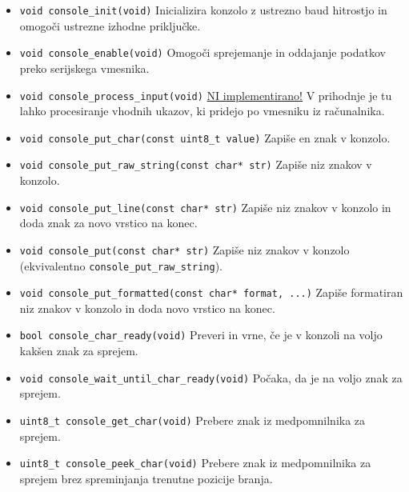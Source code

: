 \documentclass[12pt,a4paper,twoside,openright,slovene]{book}
\begin{document}
\begin{itemize}
	\item[] \lstinline{void console_init(void)}\newline
		Inicializira konzolo z ustrezno baud hitrostjo in omogoči ustrezne izhodne priključke.
	\item[] \lstinline{void console_enable(void)}\newline
		Omogoči sprejemanje in oddajanje podatkov preko serijskega vmesnika.
	\item[] \lstinline{void console_process_input(void)}\newline
		\underline{NI implementirano!} V prihodnje je tu lahko procesiranje vhodnih ukazov, ki pridejo po vmesniku iz računalnika.
	\item[] \lstinline{void console_put_char(const uint8_t value)}\newline
		Zapiše en znak v konzolo.
	\item[] \lstinline{void console_put_raw_string(const char* str)}\newline
		Zapiše niz znakov v konzolo.
	\item[] \lstinline{void console_put_line(const char* str)}\newline
		Zapiše niz znakov v konzolo in doda znak za novo vrstico na konec.
	\item[] \lstinline{void console_put(const char* str)}\newline
		Zapiše niz znakov v konzolo (ekvivalentno \lstinline{console_put_raw_string}).
	\item[] \lstinline{void console_put_formatted(const char* format, ...)}\newline
		Zapiše formatiran niz znakov v konzolo in doda novo vrstico na konec.
	\item[] \lstinline{bool console_char_ready(void)}\newline
		Preveri in vrne, če je v konzoli na voljo kakšen znak za sprejem.
	\item[] \lstinline{void console_wait_until_char_ready(void)}\newline
		Počaka, da je na voljo znak za sprejem.
	\item[] \lstinline{uint8_t console_get_char(void)}\newline
		Prebere znak iz medpomnilnika za sprejem.
	\item[] \lstinline{uint8_t console_peek_char(void)}\newline
		Prebere znak iz medpomnilnika za sprejem brez spreminjanja trenutne pozicije branja.
\end{itemize}
\end{document}
